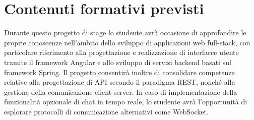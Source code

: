 \section*{Contenuti formativi previsti}
Durante questo progetto di stage lo studente avrà occasione di approfondire le proprie conoscenze nell'ambito dello sviluppo di applicazioni web full-stack, con particolare riferimento alla progettazione e realizzazione di interfacce utente tramite il framework Angular e allo sviluppo di servizi backend basati sul framework Spring. Il progetto consentirà inoltre di consolidare competenze relative alla progettazione di API secondo il paradigma REST, nonché alla gestione della comunicazione client-server. In caso di implementazione della funzionalità opzionale di chat in tempo reale, lo studente avrà l'opportunità di esplorare protocolli di comunicazione alternativi come WebSocket.

\newpage